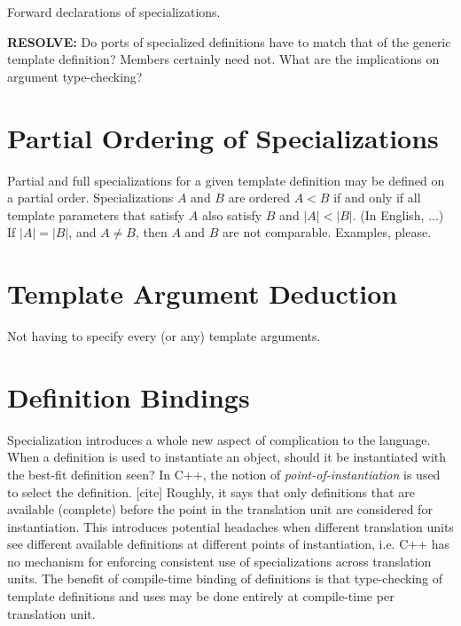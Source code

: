 Forward declarations of specializations.  

\textbf{RESOLVE:}
Do ports of specialized definitions have to match that of the 
generic template definition?  Members certainly need not.  
What are the implications on argument type-checking?

\section{Partial Ordering of Specializations}
\label{sec:templates:partialorder}

Partial and full specializations for a given template definition
may be defined on a partial order.  
Specializations $A$ and $B$ are ordered $A < B$ if and only if
all template parameters that satisfy $A$ also satisfy $B$ and $|A| < |B|$.  
(In English, ...)
If $|A| = |B|$, and $A \neq B$, then $A$ and $B$ are not comparable.  
Examples, please.  

\section{Template Argument Deduction}
\label{sec:templates:deduction}

Not having to specify every (or any) template arguments.

\section{Definition Bindings}
\label{sec:templates:bind}

Specialization introduces a whole new aspect of complication to the language.  
When a definition is used to instantiate an object, should it be 
instantiated with the best-fit definition seen?  
In C++, the notion of \emph{point-of-instantiation} is used to 
select the definition.  [cite]
Roughly, it says that only definitions that are available (complete)
before the point in the translation unit are considered for instantiation.  
This introduces potential headaches when different translation units
see different available definitions at different points of instantiation, 
i.e. C++ has no mechanism for enforcing consistent use of specializations
across translation units.  
The benefit of compile-time binding of definitions is that type-checking
of template definitions and uses may be done entirely at compile-time
per translation unit.  

